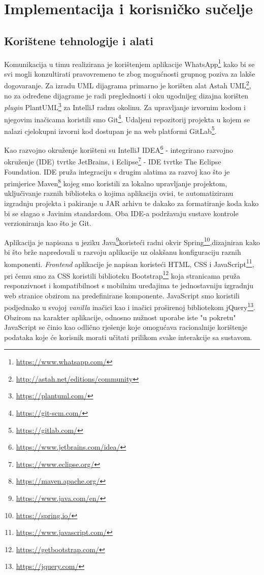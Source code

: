 \chapter{Implementacija i korisničko sučelje}
		
		
		\section{Korištene tehnologije i alati}
			
		Komunikacija u timu realizirana je korištenjem aplikacije WhatsApp\footnote{\url{https://www.whatsapp.com/}} kako bi se svi mogli konzultirati pravovremeno te zbog mogućnosti grupnog poziva za lakše dogovaranje. Za izradu UML dijagrama primarno je korišten alat Astah UML\footnote{\url{http://astah.net/editions/community}}, no za određene dijagrame je radi preglednosti i oku ugodnijeg dizajna korišten \textit{plugin} PlantUML\footnote{\url{https://plantuml.com/}} za IntelliJ radnu okolinu. Za upravljanje izvornim kodom i njegovim inačicama koristili smo Git\footnote{\url{https://git-scm.com/}}. Udaljeni repozitorij projekta u kojem se nalazi cjelokupni izvorni kod dostupan je na web platformi GitLab\footnote{\url{https://gitlab.com/}}.
			
				Kao razvojno okruženje korišteni su IntelliJ IDEA\footnote{\url{https://www.jetbrains.com/idea/}} - integrirano razvojno okruženje (IDE) tvrtke JetBrains, i Eclipse\footnote{\url{https://www.eclipse.org/}} - IDE tvrtke The Eclipse Foundation. IDE pruža integraciju s drugim alatima za razvoj kao što je primjerice Maven\footnote{\url{https://maven.apache.org/}} kojeg smo koristili za lokalno upravljanje projektom, uključivanje raznih biblioteka o kojima aplikacija ovisi, te automatiziranu izgradnju projekta i pakiranje u JAR arhivu te dakako za formatiranje koda kako bi se slagao s Javinim standardom. Oba IDE-a podržavaju sustave kontrole verzioniranja kao što je Git.
				
				Aplikacija je napisana u jeziku Java\footnote{\url{https://www.java.com/en/}}koristeći radni okvir Spring\footnote{\url{https://spring.io/}},dizajniran kako bi što brže napredovali u razvoju aplikacije uz olakšanu konfiguraciju raznih komponenti. \textit{Frontend} aplikacije je napisan koristeći HTML, CSS i JavaScript\footnote{\url{https://www.javascript.com/}}, pri čemu smo za CSS koristili biblioteku Bootstrap\footnote{\url{https://getbootstrap.com/}} koja stranicama pruža responzivnost i kompatibilnost s mobilnim uređajima te jednostavniju izgradnju web stranice obzirom na predefinirane komponente. JavaScript smo koristili podjednako u svojoj \textit{vanilla} inačici kao i inačici proširenoj bibliotekom jQuery\footnote{\url{https://jquery.com/}}. Obzirom na karakter aplikacije, odnosno nužnost uporabe iste "u pokretu" JavaScript se činio kao odlično rješenje koje omogućava racionalnije korištenje podataka koje će korisnik morati učitati prilikom svake interakcije sa sustavom. 
				
